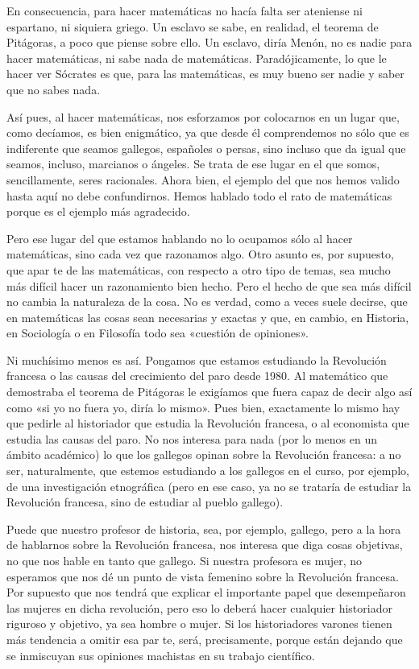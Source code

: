 \documentclass[draft,9pt,letterpaper,twocolumn,openany]{extbook}
\newcommand{\notar}[1]{\marginnote{\small\sffamily #1}[-.8em]}
\begin{document}
En consecuencia, para hacer matemáticas no hacía falta
ser ateniense ni espartano, ni siquiera griego. Un
esclavo se sabe, en realidad, el teorema de Pitágoras, a
poco que piense sobre ello. Un esclavo, diría Menón, no es
nadie para hacer matemáticas, ni sabe nada de
matemáticas. Paradójicamente, lo que le hacer ver
Sócrates es que, para las matemáticas, es muy bueno ser
nadie y saber que no sabes nada.

Así pues, al hacer matemáticas, nos esforzamos por
colocarnos en un lugar que, como decíamos, es bien
enigmático, ya que desde él comprendemos no sólo que
es indiferente que seamos gallegos, españoles o persas,
sino incluso que da igual que seamos, incluso, marcianos
o ángeles. Se trata de ese lugar en el que somos,
sencillamente, seres racionales. Ahora bien, el ejemplo
del que nos hemos valido hasta aquí no debe
confundirnos. Hemos hablado todo el rato de matemáticas
porque es el ejemplo más agradecido. 

Pero ese lugar del que estamos hablando no lo ocupamos sólo al hacer
matemáticas, sino cada vez que razonamos algo. Otro
asunto es, por supuesto, que apar te de las matemáticas,
con respecto a otro tipo de temas, sea mucho más difícil
hacer un razonamiento bien hecho. Pero el hecho de que
sea más difícil no cambia la naturaleza de la cosa. No es
verdad, como a veces suele decirse, que en matemáticas
las cosas sean necesarias y exactas y que, en cambio, en
Historia, en Sociología o en Filosofía todo sea «cuestión      
de opiniones». 

Ni muchísimo menos es así. Pongamos que         
estamos estudiando la Revolución francesa o las causas         
del crecimiento del paro desde 1980. Al matemático que         
demostraba el teorema de Pitágoras le exigíamos que
fuera capaz de decir algo así como «si yo no fuera yo, diría
lo mismo». Pues bien, exactamente lo mismo hay que
pedirle al historiador que estudia la Revolución francesa, o
al economista que estudia las causas del paro. No nos
interesa para nada (por lo menos en un ámbito
académico) lo que los gallegos opinan sobre la Revolución
francesa: a no ser, naturalmente, que estemos estudiando
a los gallegos en el curso, por ejemplo, de una
investigación etnográfica (pero en ese caso, ya no se
trataría de estudiar la Revolución francesa, sino de
estudiar al pueblo gallego). 

Puede que nuestro profesor de
historia, sea, por ejemplo, gallego, pero a la hora de  
hablarnos sobre la Revolución francesa, nos interesa que
diga cosas objetivas, no que nos hable en tanto que
gallego. Si nuestra profesora es mujer, no esperamos que
nos dé un punto de vista femenino sobre la Revolución
francesa. Por supuesto que nos tendrá que explicar el
importante papel que desempeñaron las mujeres en dicha
revolución, pero eso lo deberá hacer cualquier historiador
riguroso y objetivo, ya sea hombre o mujer. Si los
historiadores varones tienen más tendencia a omitir esa
par te, será, precisamente, porque están dejando que se
inmiscuyan sus opiniones machistas en su trabajo
científico. 
\end{document}

